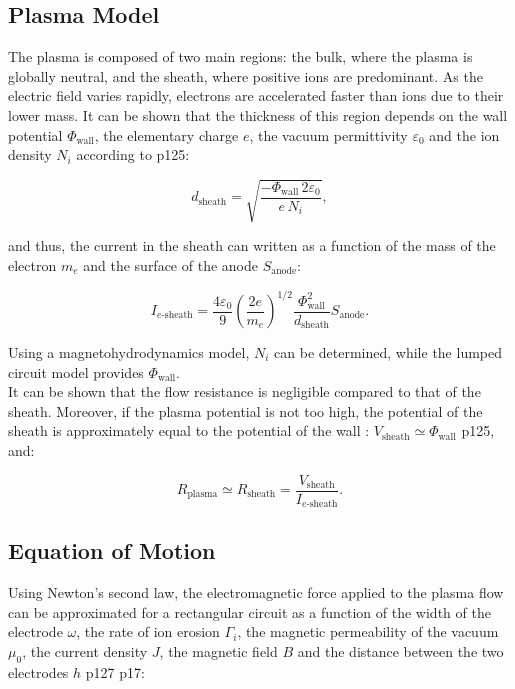 \subsection{Plasma Model}

The plasma is composed of two main regions: the bulk, where the plasma is globally neutral, and the sheath, where positive ions are predominant. As the electric field varies rapidly, electrons are accelerated faster than ions due to their lower mass. It can be shown that the thickness of this region depends on the wall potential $\Phi_{\text{wall}}$, the elementary charge $e$, the vacuum permittivity $ \varepsilon_0$ and the ion density $N_i$ according to \cite{Shaw_2011} p125:

\begin{equation}
d_{\text{sheath}} = \sqrt{\frac{-\Phi_{\text{wall}} \, 2 \varepsilon_0}{e \, N_i}},
\end{equation}

and thus, the current in the sheath can written as a function of the mass of the electron $m_e$ and the surface of the anode $S_{\text{anode}}$:

\begin{equation}
I_{e\text{-sheath}}
= \frac{4 \varepsilon_0}{9}
\left(\frac{2e}{m_e}\right)^{1/2}
\frac{\Phi_{\text{wall}}^2}{d_{\text{sheath}}} S_{\text{anode}}.
\end{equation}

Using a magnetohydrodynamics model, $N_i$ can be determined, while the lumped circuit model provides $\Phi_{\text{wall}}$.
\\[0.5cm]

It can be shown that the flow resistance is negligible compared to that of the sheath. Moreover, if the plasma potential is not too high, the potential of the sheath is approximately equal to the potential of the wall : $V_{\text{sheath}} \simeq \Phi_{\text{wall}}$ \cite{Shaw_2011} p125, and:

\begin{equation}
R_{\text{plasma}} \simeq R_{\text{sheath}} = \frac{V_{\text{sheath}}}{I_{e\text{-sheath}}}.
\end{equation}

\subsection{Equation of Motion}

Using Newton’s second law, the electromagnetic force applied to the plasma flow can be approximated for a rectangular circuit as a function of the width of the electrode $\omega$, the rate of ion erosion $\Gamma_i$, the magnetic permeability of the vacuum $\mu_0$, the current density $J$, the magnetic field $B$ and the distance between the two electrodes $h$  \cite{Shaw_2011} p127 \cite{Grand_2021} p17:

